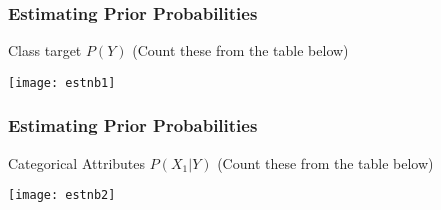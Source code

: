 %
%
%
%

\begin{frame}[fragile]\frametitle{Estimating Prior Probabilities }
Class target $P(Y)$ (Count these from the table below)
\begin{center}
\texttt{[image: estnb1]}
\end{center}
\end{frame}

\begin{frame}[fragile]\frametitle{Estimating Prior Probabilities }
Categorical Attributes $P(X_1|Y)$ (Count these from the table below)
\begin{center}
\texttt{[image: estnb2]}
\end{center}
\end{frame}


